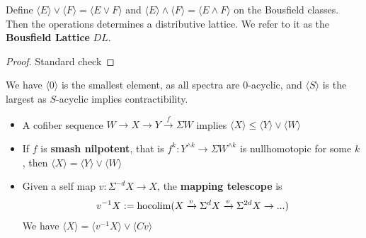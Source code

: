 \begin{proposition}
    Define $\langle E\rangle\vee \langle F\rangle=\langle E\vee F\rangle$ and $\langle E\rangle\wedge \langle F\rangle=\langle E\wedge F\rangle$ on the Bousfield classes. Then the operations determines a distributive lattice. We refer to it as the \textbf{Bousfield Lattice} $DL$.
\end{proposition}
\begin{proof}
Standard check
\end{proof}

We have $\langle0\rangle$ is the smallest element, as all spectra are $0$-acyclic, and $\langle S\rangle$ is the largest as $S$-acyclic implies contractibility.
\begin{theorem}
    \cite{ChrMehrle} 
    \begin{itemize}
    \item A cofiber sequence $W\to X\to Y\xrightarrow{f}\Sigma W$ implies $\langle X\rangle \leq \langle Y\rangle\vee\langle W\rangle $
    \item If $f$ is \textbf{smash nilpotent}, that is $f^k: Y^{\wedge k}\to \Sigma W^{\wedge k}$ is nullhomotopic for some $k$, then $\langle X\rangle =\langle Y\rangle\vee\langle W\rangle $
    \item Given a self map $v: \Sigma^{-d}X\to X$, the \textbf{mapping telescope} is
\begin{align*}
    v^{-1}X:=\operatorname{hocolim}(X\xrightarrow{v}\Sigma^{d}X\xrightarrow{v}\Sigma^{2d}X\to ...)
\end{align*} We have $\langle X\rangle = \langle v^{-1}X\rangle\vee\langle Cv\rangle $
    \end{itemize}
\end{theorem}
